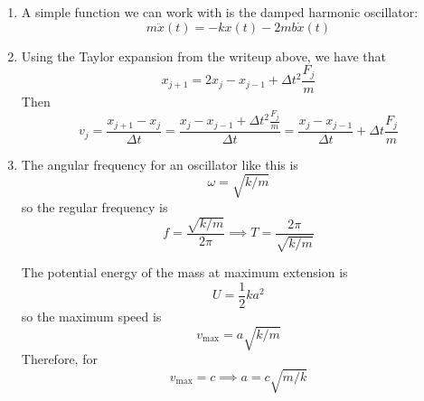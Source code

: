 \documentclass{article}
\begin{document}
    \begin{enumerate}
        \item A simple function we can work with is the damped harmonic oscillator:
        \begin{equation*}
            m \ddot{x}(t) = -kx(t) - 2mb\dot{x}(t)
        \end{equation*}
        \item Using the Taylor expansion from the writeup above, we have that
        \begin{equation*}
            x_{j+1} = 2x_{j} - x_{j-1} + \Delta t^2 \frac{F_j}{m}
        \end{equation*}
        Then
        \begin{equation*}
            v_j = \frac{x_{j+1} - x_j}{\Delta t} = \frac{x_{j} - x_{j-1} + \Delta t^2 \frac{F_j}{m}}{\Delta t} =
            \frac{x_j - x_{j-1}}{\Delta t} + \Delta t \frac{F_j}{m}
        \end{equation*}

        \item The angular frequency for an oscillator like this is
        \begin{equation*}
            \omega = \sqrt{k/m}
        \end{equation*}
        so the regular frequency is
        \begin{equation*}
            f = \frac{\sqrt{k/m}}{2\pi} \implies T = \frac{2\pi}{\sqrt{k/m}}
        \end{equation*}

        The potential energy of the mass at maximum extension is
        \begin{equation*}
            U = \frac{1}{2}k a^2
        \end{equation*}
        so the maximum speed is
        \begin{equation*}
            v_{\text{max}} = a\sqrt{k/m}
        \end{equation*}
        Therefore, for
        \begin{equation*}
            v_{\text{max}} = c \implies a = c\sqrt{m/k}
        \end{equation*}
    \end{enumerate}
\end{document}
